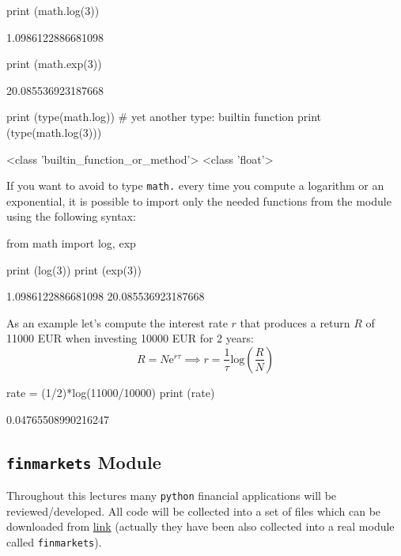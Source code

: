 \begin{ipythonnon}
print (math.log(3))
\end{ipythonnon}
\begin{ioutput}
1.0986122886681098	
\end{ioutput}

\begin{ipythonnon}
print (math.exp(3))
\end{ipythonnon}
\begin{ioutput}
20.085536923187668	
\end{ioutput}

\begin{ipythonnon}
print (type(math.log)) # yet another type: builtin function
print (type(math.log(3)))
\end{ipythonnon}
\begin{ioutput}
<class 'builtin\_function\_or\_method'>
<class 'float'>	
\end{ioutput}

If you want to avoid to type \texttt{math.} every time you compute a logarithm or an exponential, it is possible to import only the needed functions from the module using the following syntax:

\begin{ipythonnon}
from math import log, exp

print (log(3))
print (exp(3))
\end{ipythonnon}
\begin{ioutput}
1.0986122886681098
20.085536923187668	
\end{ioutput}

As an example let's compute the interest rate $r$ that produces a return $R$ of 11000 EUR when investing 10000 EUR for 2 years:
\begin{equation*}
R = N\mathrm{e}^{r\tau} \implies r = \frac{1}{\tau} \mathrm{log}(\frac{R}{N})
\end{equation*}

\begin{ipythonnon}
rate = (1/2)*log(11000/10000)
print (rate)
\end{ipythonnon}
\begin{ioutput}
0.04765508990216247	
\end{ioutput}

\subsection{\texttt{finmarkets} Module}

Throughout this lectures many \texttt{python} financial applications will be reviewed/developed. All code will be collected into a set of files which can be downloaded from \href{https://drive.google.com/drive/uc?id=1r1CERgx0pTEYutJvptCoFrrvR7drXDyR}{link} (actually they have been also collected into a real module called \texttt{finmarkets}). 

